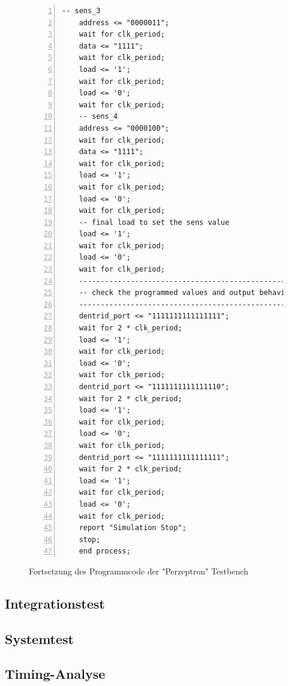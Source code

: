 \documentclass{article}
\numberwithin{equation}{section}
\begin{document}
\begin{figure}[htbp]
    \begin{lstlisting}[style=VHDL,numbers=left,stepnumber=1,style=myCustomMatlabStyle,basicstyle=\footnotesize]
    -- sens_3
    address <= "0000011";
    wait for clk_period;
    data <= "1111";
    wait for clk_period;
    load <= '1';
    wait for clk_period;
    load <= '0';
    wait for clk_period;
    -- sens_4
    address <= "0000100";
    wait for clk_period;
    data <= "1111";
    wait for clk_period;
    load <= '1';
    wait for clk_period;
    load <= '0';
    wait for clk_period;
    -- final load to set the sens value
    load <= '1';
    wait for clk_period;
    load <= '0';
    wait for clk_period;
    ------------------------------------------------------
    -- check the programmed values and output behaviour --
    ------------------------------------------------------
    dentrid_port <= "1111111111111111";
    wait for 2 * clk_period;
    load <= '1';
    wait for clk_period;
    load <= '0';
    wait for clk_period;
    dentrid_port <= "1111111111111110";
    wait for 2 * clk_period;
    load <= '1';
    wait for clk_period;
    load <= '0';
    wait for clk_period;
    dentrid_port <= "1111111111111111";
    wait for 2 * clk_period;
    load <= '1';
    wait for clk_period;
    load <= '0';
    wait for clk_period;
    report "Simulation Stop";
    stop;
    end process;
\end{lstlisting}
\caption{Fortsetzung des Programmcode der "Perzeptron" Testbench} \label{code:perceptron_testbench_2}
\end{figure}
\FloatBarrier
\subsection{Integrationstest}

\subsection{Systemtest}

\subsection{Timing-Analyse}
\end{document}
